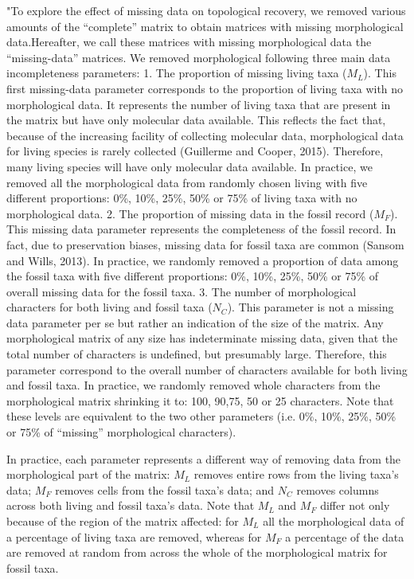 \documentclass[12pt,letterpaper]{article}
\begin{document}
\begin{enumerate}
"To explore the effect of missing data on topological recovery, we removed various amounts of the “complete” matrix to obtain matrices with missing morphological data.Hereafter, we call these matrices with missing morphological data the “missing-data” matrices. We removed morphological following three main data incompleteness parameters:
1. The proportion of missing living taxa ($M_L$). This first missing-data parameter corresponds to the proportion of living taxa with no morphological data. It represents the number of living taxa that are present in the matrix but have only molecular data available. This reflects the fact that, because of the increasing facility of collecting molecular data, morphological data for living species is rarely collected (Guillerme and Cooper, 2015). Therefore, many living species will have only molecular data available. In practice, we removed all the morphological data from randomly chosen living with five different proportions: 0\%, 10\%, 25\%, 50\% or 75\% of living taxa with no morphological data.
2. The proportion of missing data in the fossil record ($M_F$). This missing data parameter represents the completeness of the fossil record. In fact, due to preservation biases, missing data for fossil taxa are common (Sansom and Wills, 2013). In practice, we randomly removed a proportion of data among the fossil taxa with five different proportions: 0\%, 10\%, 25\%, 50\% or 75\% of overall missing data for the fossil taxa.
3. The number of morphological characters for both living and fossil taxa ($N_C$). This parameter is not a missing data parameter per se but rather an indication of the size of the matrix. Any morphological matrix of any size has indeterminate missing data, given that the total number of characters is undefined, but presumably large. Therefore, this parameter correspond to the overall number of characters available for both living and fossil taxa. In practice, we randomly removed whole characters from the morphological matrix shrinking it to: 100, 90,75, 50 or 25 characters.
Note that these levels are equivalent to the two other parameters (i.e. 0\%, 10\%, 25\%, 50\% or 75\% of “missing” morphological characters).

In practice, each parameter represents a different way of removing data from the morphological part of the matrix: $M_L$ removes entire rows from the living taxa’s data; $M_F$ removes cells from the fossil taxa’s data; and $N_C$ removes columns across both living and fossil taxa’s data. Note that $M_L$  and $M_F$ differ not only because of the region of the matrix affected: for $M_L$ all the morphological data of a percentage of living taxa are removed, whereas for $M_F$ a percentage of the data are removed at random from across the whole of the morphological matrix for fossil taxa.


\end{enumerate}
\end{document}
